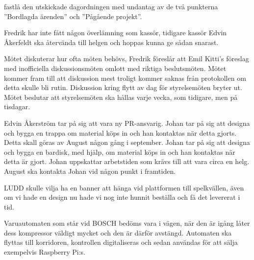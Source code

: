 \documentclass{protokoll}
\begin{document}
\newpage  


\begin{beslut}
     \att fastlå den utskickade dagordningen med undantag av de två punkterna ''Bordlagda ärenden'' och ''Pågående projekt''.
\end{beslut}

Fredrik har inte fått någon överlämning som kassör, tidigare kassör Edvin Åkerfeldt ska återvända till helgen och hoppas kunna ge sådan snarast. 

Mötet diskuterar hur ofta möten behövs, Fredrik föreslår att Emil Kitti's föreslag med inofficiella diskussionsmöten omlott med riktiga beslutsmöten. Mötet kommer fram till att diskussion mest troligt kommer saknas från protokollen om detta skulle bli rutin. 
Diskussion kring flytt av dag för styrelsemöten bryter ut. 
Mötet beslutar att styrelsemöten ska hållas varje vecka, som tidigare, men på tisdagar. 

Edvin Åkerström tar på sig att vara ny PR-ansvarig.
Johan tar på sig att designa och bygga en trappa om material köps in och han kontaktas när detta gjorts. Detta skall göras av August någon gång i september.
Johan tar på sig att designa och bygga en bardisk, med hjälp, om material köps in och han kontaktas när detta är gjort. Johan uppskattar arbetstiden som krävs till att vara circa en helg. August ska kontakta Johan vid någon punkt i framtiden.

LUDD skulle vilja ha en banner att hänga vid plattformen till spelkvällen, även om vi hade en design nu hade vi nog inte hunnit beställa och få det levererat i tid.

Varuautomaten som står vid BOSCH bedöms vara i vägen, när den är igång låter dess kompressor väldigt mycket och den är därför avstängd. Automaten ska flyttas till korridoren, kontrollen digitaliseras och sedan användas för att sälja exempelvis Raspberry Pi:s.
\end{document}
